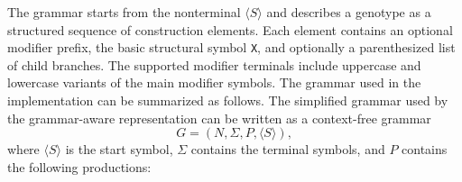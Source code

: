 The grammar starts from the nonterminal \(\langle S\rangle\) and describes a genotype as a structured sequence of construction elements. Each element contains an optional modifier prefix, the basic structural symbol \texttt{X}, and optionally a parenthesized list of child branches. The supported modifier terminals include uppercase and lowercase variants of the main \fone{} modifier symbols. The grammar used in the implementation can be summarized as follows.
The simplified grammar used by the grammar-aware representation can be written as a context-free grammar
\[
G = (N, \Sigma, P, \langle S\rangle),
\]
where \(\langle S\rangle\) is the start symbol, \(\Sigma\) contains the terminal \fone{} symbols, and \(P\) contains the following productions:
